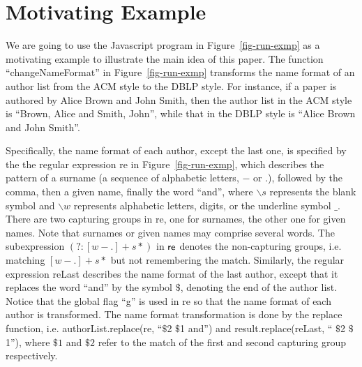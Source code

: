 
\section{Motivating Example}\label{sec:mot}

We are going to use the Javascript program in Figure~\ref{fig-run-exmp} as a motivating example to illustrate the main idea of this paper. 
The function ``changeNameFormat''  in Figure~\ref{fig-run-exmp} transforms the name format of an author list from the ACM style to the DBLP style. For instance,  if a paper is authored by Alice Brown and John Smith, then the author list in the ACM style is ``Brown, Alice and Smith, John'', while that in the DBLP style is ``Alice Brown and John Smith''. 

Specifically,  the name format of each author, except the last one, is specified by the the regular expression {\sf re}  in Figure~\ref{fig-run-exmp}, which describes the pattern of a surname (a sequence of alphabetic letters, $-$ or $.$), followed by the comma, then a given name, finally the word ``and'', where $\backslash s$ represents the blank symbol and $\backslash w$ represents alphabetic letters, digits, or the underline symbol $\_$. There are two capturing groups in {\sf re}, one for surnames, the other one for given names. Note that surnames or given names may comprise several words. The subexpression $(?: [w-.]+s*)$ in ${\sf re}$ denotes the non-capturing groups, i.e. matching $[w-.]+s*$ but not remembering the match.
Similarly, the regular expression {\sf reLast} describes the name format of the last author, except that it replaces the word ``and'' by the symbol $\$$, denoting the end of the author list. Notice that the global flag ``g'' is used in {\sf re} so that the name format of each author is transformed. The name format transformation is done by the {\sf replace} function, i.e. {\sf authorList.replace(re, ``$\$$2 $\$$1 and'')} and  {\sf result.replace(reLast, `` $\$$2 $\$$1'')}, where $\$1$ and $\$2$ refer to the match of the first and second capturing group respectively. 

